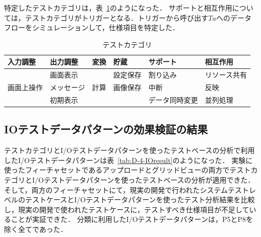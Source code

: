 特定したテストカテゴリは，表~\ref{tab:D-4-TestCategory}のようになった．
サポートと相互作用については，テストカテゴリがトリガーとなる．トリガーから呼び出す$Ta$へのデータフローをシミュレーションして，仕様項目を特定した．


\begin{table}[htbp]
  \centering
  \caption{テストカテゴリ}
    \begin{tabular}{|l|p{5.415em}|l|l|l|l|}
    \hline
          \multicolumn{1}{|p{4em}|}{入力調整} & 出力調整 & \multicolumn{1}{p{2.5em}|}{変換} & \multicolumn{1}{p{3em}|}{貯蔵} & \multicolumn{1}{p{6em}|}{サポート} & \multicolumn{1}{p{6em}|}{相互作用} \bigstrut\\
    \hline
    \hline
\multicolumn{1}{|l|}{\multirow{3}[2]{*}{画面上操作}} & 画面表示  & \multicolumn{1}{l|}{\multirow{3}[2]{*}{計算}} & \multicolumn{1}{p{4em}|}{設定保存} & 割り込み  & リソース共有 \bigstrut[t]\\
                & メッセージ &       & \multicolumn{1}{p{4em}|}{画像保存} & 中断    & 反映 \\
                & 初期表示  &       &       & データ同時変更 & 並列処理 \bigstrut[b]\\
    \hline
    \end{tabular}%
  \label{tab:D-4-TestCategory}%
\end{table}%

\subsection{IOテストデータパターンの効果検証の結果}
テストカテゴリとI/Oテストデータパターンを使ったテストベースの分析で利用したI/Oテストデータパターンは表~\ref{tab:D-4-IOresult}のようになった．
実験に使ったフィーチャセットであるアップロードとグリッドビューの両方でテストカテゴリとI/Oテストデータパターンを使ったテストベースの分析が適用できた．
そして，両方のフィーチャセットにて，現実の開発で行われたシステムテストレベルのテストケースとI/Oテストデータパターンを使ったテスト分析結果を比較し，現実の開発で使われたテストケースに，テストすべき仕様項目が不足していることが実証できた．
分類に利用したI/Oテストデータパターンは，P5とP8を除く全てであった．

